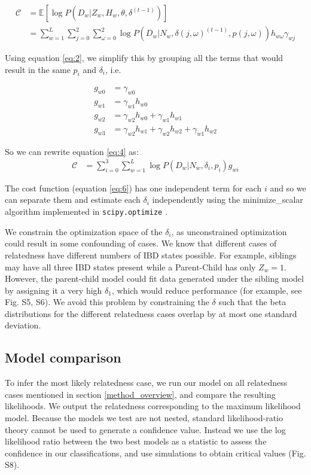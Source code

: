 \documentclass[12pt, letterpaper]{article}
\begin{document}
\begin{align}\label{eq:4}
\mathcal{C} &= \mathbb{E}[\log P(D_w|Z_w, H_w, \theta, \delta^{(t-1)})]\nonumber\\
&= \sum_{w=1}^L \sum_{j=0}^2\sum^2_{\omega=0} \log P(D_{w}|N_w, \delta(j ,\omega)^{(t-1)}, p(j,\omega))h_{w\omega}\gamma_{wj}
\end{align}


Using equation \ref{eq:2}, we simplify this by grouping all the terms that would result in the same $p_i$ and $\delta_i$, i.e.

\begin{align*}\label{eq:5}
g_{w0} &= \gamma_{w0}\\
g_{w1} &= \gamma_{w1} h_{w0}\\
g_{w2} &= \gamma_{w2} h_{w0} + \gamma_{w1} h_{w1}\\
g_{w3} &= \gamma_{w2} h_{w1} + \gamma_{w2} h_{w2} + \gamma_{w1} h_{w2}
\end{align*}

So we can rewrite equation \ref{eq:4} as:
\begin{align}\label{eq:6}
\mathcal{C} &= \sum_{i=0}^3 \sum_{w=1}^L \log P(D_{w}|N_w, \delta_i, p_i)g_{wi}
\end{align}

The cost function (equation \ref{eq:6}) has one independent term for each $i$ and so we can separate them and estimate each $\delta_i$ independently using the minimize\_scalar algorithm implemented in \texttt{scipy.optimize} \cite{virtanen_scipy_2020}. 


We constrain the optimization space of the $\delta_i$, as unconstrained optimization could result in some confounding of cases. We know that different cases of relatedness have different numbers of IBD states possible. For example, siblings may have all three IBD states present while a Parent-Child has only $Z_w=1$. However, the parent-child model could fit data generated under the sibling model by assigning it a very high $\delta_1$, which would reduce performance (for example, see Fig. S5, S6). We avoid this problem by constraining the $\delta$ such that the beta distributions for the different relatedness cases overlap by at most one standard deviation.

\subsection{Model comparison}\label{model_comp}
To infer the most likely relatedness case, we run our model on all relatedness cases mentioned in section \ref{method_overview}, and compare the resulting likelihoods. We output the relatedness corresponding to the maximum likelihood model. Because the models we test are not nested, standard likelihood-ratio theory cannot be used to generate a confidence value. Instead we use the log likelihood ratio between the two best models as a statistic to assess the confidence in our classifications, and use simulations to obtain critical values (Fig. S8).
\end{document}
